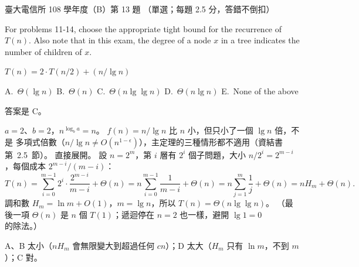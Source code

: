 \begin{pastexam}[label={px:ntu-108-comm-dsab-13}]{臺大電信所 108 學年度（B）第 13 題}
（單選；每題 2.5 分，答錯不倒扣）

For problems 11-14, choose the appropriate tight bound for the recurrence of $T(n)$. Also note
that in this exam, the degree of a node $x$ in a tree indicates the number of children of $x$.

$T(n)=2\cdot T(n/2)+(n/\lg n)$

A.~$\Theta(\lg n)$ \qquad B.~$\Theta(n)$ \qquad C.~$\Theta(n\lg\lg n)$ \qquad D.~$\Theta(n\lg n)$
\qquad E.~None of the above
\end{pastexam}

\begin{pastsoln}
答案是 C。

$a = 2$、$b = 2$，$n^{\log_b a} = n$。 $f(n) = n / \lg n$ 比 $n$ 小，但只小了一個 $\lg n$ 倍，不是
多項式倍數（$n / \lg n \ne O(n^{1 - \epsilon})$），主定理的三種情形都不適用（資結書第~2.5~節）。
直接展開。 設 $n = 2^m$，第 $i$ 層有 $2^i$ 個子問題，大小 $n / 2^i = 2^{m - i}$，每個成本
$2^{m-i} / (m - i)$：
\[
T(n) = \sum_{i=0}^{m-1} 2^i \cdot \frac{2^{m-i}}{m - i} + \Theta(n)
= n \sum_{i=0}^{m-1} \frac{1}{m - i} + \Theta(n)
= n \sum_{j=1}^{m} \frac{1}{j} + \Theta(n) = n H_m + \Theta(n).
\]
調和數 $H_m = \ln m + O(1)$，$m = \lg n$，所以 $T(n) = \Theta(n \lg \lg n)$。 （最後一項
$\Theta(n)$ 是 $n$ 個 $T(1)$；遞迴停在 $n = 2$ 也一樣，避開 $\lg 1 = 0$ 的除法。）

A、B 太小（$n H_m$ 會無限變大到超過任何 $cn$）；D 太大（$H_m$ 只有 $\ln m$，不到 $m$）；C 對。
\end{pastsoln}
